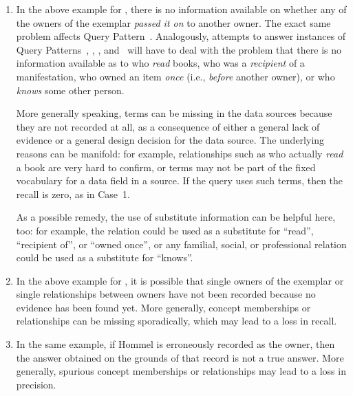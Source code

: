 \begin{enumerate}
  \item
    In the above example for , there is no information available on whether any of the owners of the exemplar
    \emph{passed it on} to another owner. The exact same problem affects Query Pattern~.
    Analogously,
    attempts to answer instances of Query Patterns~, , , and~
    will have to deal
    with the problem that there is no information available as to who \emph{read} books,
    who was a \emph{recipient} of a manifestation, who owned an item \emph{once} (i.e., \emph{before} another owner),
    or who \emph{knows} some other person.
    
    More generally speaking, terms can be missing in the data sources
    because they are not recorded at all, as a consequence of either a general lack of evidence
    or a general design decision for the data source. The underlying reasons can be manifold:
    for example, relationships such as who actually \emph{read} a book are very hard to confirm,
    or terms may not be part of the fixed vocabulary for a data field in a source.
    If the query uses such terms, then the recall is zero, as in Case~1.
    
    As a possible remedy, the use of substitute information can be helpful here, too:
    for example, the relation  could be used as a substitute for
    \enquote{read}, \enquote{recipient of}, or \enquote{owned once},
    or any familial, social, or professional relation could be used as a substitute for \enquote{knows}.
  \item    
    In the above example for , it is possible that single owners of the exemplar or single relationships between owners
    have not been recorded because no evidence has been found yet.
    More generally, concept memberships or relationships can be missing sporadically,
    which may lead to a loss in recall.
  \item
    In the same example, if Hommel is erroneously recorded as the owner, then the answer obtained on the grounds
    of that record is not a true answer.
    More generally, spurious concept memberships or relationships may lead to a loss in precision.
\end{enumerate}
